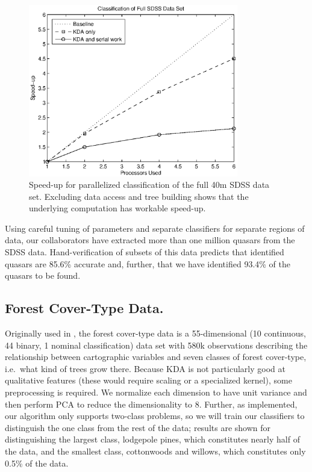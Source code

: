 \documentclass[twoside,leqno,twocolumn]{article}
\begin{document}
\begin{figure}[tb]
  \begin{center}
    \hspace*{-.3in}
    \includegraphics[width=3.6in]{para_speedup.eps}
    \hspace*{-.3in}
  \end{center}
  \vspace{-15pt}
  \caption{\label{fig:bad-para-speedup}\footnotesize Speed-up for
    parallelized classification of the full 40m SDSS data set.
    Excluding data access and tree building shows that the underlying
    computation has workable speed-up.}
\end{figure}

Using careful tuning of parameters and separate classifiers for
separate regions of data, our collaborators have extracted more than
one million quasars from the SDSS data.  Hand-verification of subsets
of this data predicts that identified quasars are 85.6\% accurate and,
further, that we have identified 93.4\% of the quasars to be found.

\subsection{Forest Cover-Type Data.}
Originally used in \cite{blackard98}, the forest cover-type data is a
55-dimensional (10 continuous, 44 binary, 1 nominal classification)
data set with 580k observations describing the relationship between
cartographic variables and seven classes of forest cover-type,
i.e.~what kind of trees grow there.  Because KDA is not particularly
good at qualitative features (these would require scaling or a
specialized kernel), some preprocessing is required.  We normalize
each dimension to have unit variance and then perform PCA to reduce
the dimensionality to 8.  Further, as implemented, our algorithm only
supports two-class problems, so we will train our classifiers to
distinguish the one class from the rest of the data; results are shown
for distinguishing the largest class, lodgepole pines, which
constitutes nearly half of the data, and the smallest class,
cottonwoods and willows, which constitutes only 0.5\% of the data.
\end{document}
